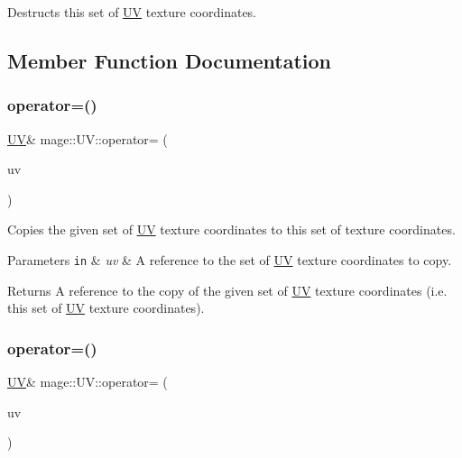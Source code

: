 Destructs this set of \hyperlink{structmage_1_1_u_v}{UV} texture coordinates. 

\subsection{Member Function Documentation}
\hypertarget{structmage_1_1_u_v_abb607259f1710f1344f83ebc21a1a5da}{}\label{structmage_1_1_u_v_abb607259f1710f1344f83ebc21a1a5da} 
\subsubsection{\texorpdfstring{operator=()}{operator=()}\hspace{0.1cm}{\footnotesize\ttfamily [1/2]}}
{\footnotesize\ttfamily \hyperlink{structmage_1_1_u_v}{UV}\& mage\+::\+U\+V\+::operator= (\begin{DoxyParamCaption}\item[{const \hyperlink{structmage_1_1_u_v}{UV} \&}]{uv }\end{DoxyParamCaption})}

Copies the given set of \hyperlink{structmage_1_1_u_v}{UV} texture coordinates to this set of texture coordinates.


\begin{DoxyParams}[1]{Parameters}
\mbox{\tt in}  & {\em uv} & A reference to the set of \hyperlink{structmage_1_1_u_v}{UV} texture coordinates to copy. \\
\hline
\end{DoxyParams}
\begin{DoxyReturn}{Returns}
A reference to the copy of the given set of \hyperlink{structmage_1_1_u_v}{UV} texture coordinates (i.\+e. this set of \hyperlink{structmage_1_1_u_v}{UV} texture coordinates). 
\end{DoxyReturn}
\hypertarget{structmage_1_1_u_v_a78eb969d0ff66360614b82aeaf6395aa}{}\label{structmage_1_1_u_v_a78eb969d0ff66360614b82aeaf6395aa} 
\subsubsection{\texorpdfstring{operator=()}{operator=()}\hspace{0.1cm}{\footnotesize\ttfamily [2/2]}}
{\footnotesize\ttfamily \hyperlink{structmage_1_1_u_v}{UV}\& mage\+::\+U\+V\+::operator= (\begin{DoxyParamCaption}\item[{\hyperlink{structmage_1_1_u_v}{UV} \&\&}]{uv }\end{DoxyParamCaption})}

